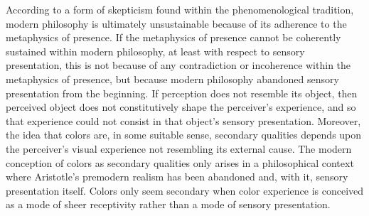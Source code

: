 According to a form of skepticism found within the phenomenological tradition, modern philosophy is ultimately unsustainable because of its adherence to the metaphysics of presence. If the metaphysics of presence cannot be coherently sustained within modern philosophy, at least with respect to sensory presentation, this is not because of any contradiction or incoherence within the metaphysics of presence, but because modern philosophy abandoned sensory presentation from the beginning. If perception does not resemble its object, then perceived object does not constitutively shape the perceiver's experience, and so that experience could not consist in that object's sensory presentation. Moreover, the idea that colors are, in some suitable sense, secondary qualities depends upon the perceiver's visual experience not resembling its external cause. The modern conception of colors as secondary qualities only arises in a philosophical context where Aristotle's premodern realism has been abandoned and, with it, sensory presentation itself. Colors only seem secondary when color experience is conceived as a mode of sheer receptivity rather than a mode of sensory presentation.

